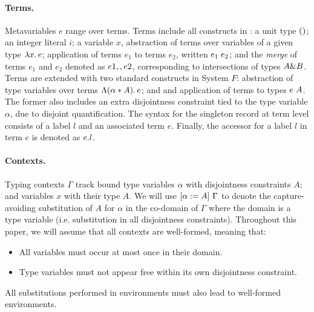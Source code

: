 \paragraph{Terms.} 
Metavariables $e$ range over terms.  
Terms include all constructs in \oldname: a unit type $\unit$; an integer literal $i$;
a variable $x$, abstraction of terms over variables of
a given type $\lamty x A e$; application of terms $e_1$ to terms $e_2$, written
$\app {e_1} {e_2}$; and the \emph{merge} of terms $e_1$ and $e_2 $ denoted as 
$e1 \mergeop e2$, corresponding to intersections of types $A \inter B$.
Terms are extended with two standard constructs in System $F$:
abstraction of type variables over terms $\blamdis \alpha A e$; and
and application of terms to types $\tapp e A$. 
The former also includes an extra disjointness constraint tied to the type 
variable $\alpha$, due to disjoint quantification.
The syntax for the singleton record at term level consists of a label $l$ and
an associated term $e$.
Finally, the accessor for a label $l$ in term $e$ is denoted as $\recordProj e l$.

\paragraph{Contexts.} Typing contexts $ \Gamma $ track bound type variables
$\alpha$ with disjointness constraints $A$; and variables $x$ with their type $A$. 
We will use $\subst {A} \alpha {\Gamma}$
to denote the capture-avoiding substitution of $A$ for $\alpha$ in the co-domain of
$\Gamma$ where the domain is a type variable (i.e. substitution in all disjointness constraints).
Throughout this paper, we will assume that all contexts are well-formed, meaning that:
\begin{itemize}
\item All variables must occur at most once in their domain.
\item Type variables must not appear free within its own disjointness constraint. 
\end{itemize}
All substitutions performed in environments must also lead to well-formed environments.



